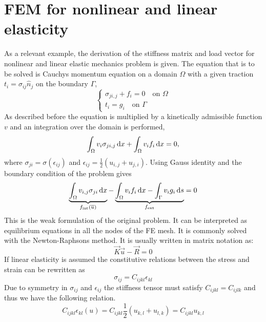 \documentclass[fem.tex]{subfiles}
\begin{document}
\section{FEM for nonlinear and linear elasticity}
\label{sec:femmech}
As a relevant example, the derivation of the stiffness matrix and load vector for nonlinear and linear elastic mechanics problem is given. The equation that is to be solved is Cauchys momentum equation on a domain $\Omega$ with a given traction $t_i = \sigma_{ij} \hat{n}_j$ on the boundary $\Gamma$,
\begin{equation} 
\left\{
\begin{array}{ll}
   \sigma_{ji,j} + f_i = 0 \quad \text{on } \Omega \\
   t_i = g_i \quad \text{on } \Gamma \end{array} \right.
    \label{eqn:cond}
\end{equation}
%
As described before the equation is multiplied by a kinetically admissible function $v$ and an integration over the domain is performed,
%
\begin{equation} 
  \int_\Omega  v_i\sigma_{ji,j} \, \mathrm{d} x + \int_\Omega v_i f_i \, \mathrm{d} x = 0, 
    \label{eqn:cond}
\end{equation}
%
where $\sigma_{ji} = \sigma(\epsilon_{ij})$ and $\epsilon_{ij} = \frac{1}{2}\left(u_{i,j} + u_{j,i} \right)$. Using Gauss identity and the boundary condition of the problem gives
%
\begin{equation} 
  \underbrace{\int_\Omega  v_{i,j} \sigma_{ji} \, \mathrm{d} x}_{f_\text{int}(\overline{u})} - \underbrace{\int_\Omega v_i f_i \, \mathrm{d} x - \int_\Gamma v_i g_i \, \mathrm{d} s}_{f_\text{ext}} = 0
    \label{eqn:weak}
\end{equation}
%
 This is the weak formulation of the original problem. It can be interpreted as equilibrium equations in all the nodes of the FE mesh. It is commonly solved with the Newton-Raphsons method. It is usually written in matrix notation as:
 \begin{equation} 
 \vec{K}\vec{u} - \vec{R} = 0
\end{equation}
 If linear elasticity is assumed the constitutive relations between the stress and strain can be rewritten as
%
\begin{equation}
\label{eqn:const} 
\sigma_{ij} = C_{ijkl} \epsilon_{kl}
\end{equation}
%
Due to symmetry in $\sigma_{ij}$ and $\epsilon_{ij}$ the stiffness tensor must satisfy $C_{ijkl} = C_{ijlk}$ and thus we have the following relation.
%
\begin{equation}
\label{eqn:symm}
 C_{ijkl}\epsilon_{kl} (u) = C_{ijkl}\frac{1}{2} \left(u_{k,l} + u_{l,k}\right) = C_{ijkl}u_{k,l} 
\end{equation}
\end{document}
